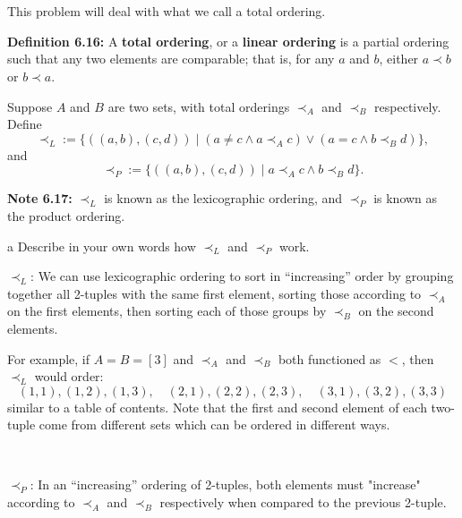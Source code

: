 \documentclass{article}
\begin{document}
\section{}

\begin{problem*}
This problem will deal with what we call a total ordering. 

\textbf{Definition 6.16:} A \textbf{total ordering}, or a \textbf{linear ordering} is a partial ordering such that any two elements are comparable; that is, for any $a$ and $b$, either $a \prec b$ or $b \prec a$.
        

Suppose $A$ and $B$ are two sets, with total orderings $\prec_A$ and $\prec_B$ respectively. Define 
\[
    \prec_L := \{((a, b), (c, d)) \mid (a \neq c \land a \prec_A c) \lor (a = c \land b \prec_B d) \},
\]
and
\[
    \prec_P := \{((a, b), (c, d)) \mid a \prec_A c \land b \prec_B d \}.
\]


\textbf{Note 6.17:} $\prec_L$ is known as the lexicographic ordering, and $\prec_P$ is known as the product ordering.
\end{problem*}

\begin{problem} a
Describe in your own words how $\prec_L$ and $\prec_P$ work. 
\end{problem}


$\prec_L$: We can use lexicographic ordering to sort in ``increasing'' order by grouping together all 2-tuples with the same first element, sorting those according to $\prec _{A}$ on the first elements, then sorting each of those groups by $\prec _{B}$ on the second elements. 

For example, if $A=B=[ 3]$ and $\prec _{A}$ and $\prec _{B}$ both functioned as $< $, then $\prec _{L}$ would order:
\begin{equation*}
( 1,1) ,( 1,2) ,( 1,3) ,\quad ( 2,1) ,( 2,2) ,( 2,3) ,\quad ( 3,1) ,( 3,2) ,( 3,3)
\end{equation*}
similar to a table of contents. Note that the first and second element of each two-tuple come from different sets which can be ordered in different ways.

\

$\prec_P$: In an ``increasing'' ordering of 2-tuples, both elements must "increase" according to $\prec_A$ and $\prec_B$ respectively when compared to the previous 2-tuple.
\end{document}
